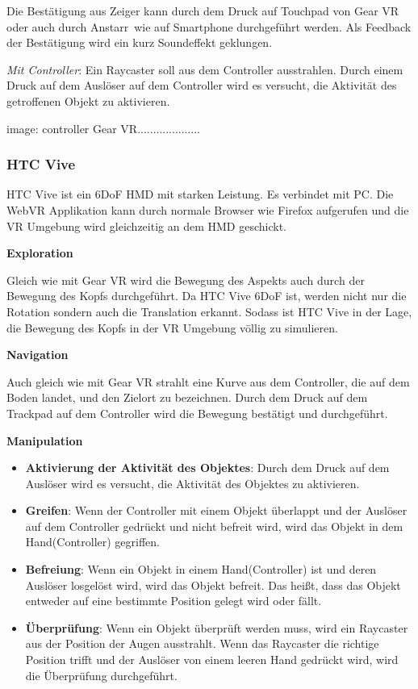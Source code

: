   Die Bestätigung aus Zeiger kann durch dem Druck auf Touchpad von Gear VR oder auch durch \glqq Anstarr\grqq\ wie auf Smartphone durchgeführt werden. Als Feedback der Bestätigung wird ein kurz Soundeffekt geklungen. 
  
  \textsl{Mit Controller}: Ein Raycaster soll aus dem Controller ausstrahlen. Durch einem Druck auf dem Auslöser auf dem Controller wird es versucht, die Aktivität des getroffenen Objekt zu aktivieren. 
  
  image: controller Gear VR....................
  
 \subsubsection{HTC Vive}
 HTC Vive ist ein 6DoF HMD mit starken Leistung. Es verbindet mit PC. Die WebVR Applikation kann durch normale Browser wie Firefox aufgerufen und die VR Umgebung wird gleichzeitig an dem HMD geschickt.
 
  \textbf{Exploration}
  
  Gleich wie mit Gear VR wird die Bewegung des Aspekts auch durch der Bewegung des Kopfs durchgeführt. Da HTC Vive 6DoF ist, werden nicht nur die Rotation sondern auch die Translation  erkannt. Sodass ist HTC Vive in der Lage, die Bewegung des Kopfs in der VR Umgebung völlig zu simulieren.
  
  \textbf{Navigation}
  
  Auch gleich wie mit Gear VR strahlt eine Kurve aus dem Controller, die auf dem Boden landet, und den Zielort zu bezeichnen. Durch dem Druck auf dem Trackpad auf dem Controller wird die Bewegung bestätigt und durchgeführt.
  
  \textbf{Manipulation}
  \begin{itemize}
  \item \textbf{Aktivierung der Aktivität des Objektes}: Durch dem Druck auf dem Auslöser wird es versucht, die Aktivität des Objektes zu aktivieren.
  \item \textbf{Greifen}: Wenn der Controller mit einem Objekt überlappt und der Auslöser auf dem Controller gedrückt und nicht befreit wird, wird das Objekt in dem Hand(Controller) gegriffen.
  \item \textbf{Befreiung}: Wenn ein Objekt in einem Hand(Controller) ist und deren Auslöser losgelöst wird, wird das Objekt befreit. Das heißt, dass das Objekt entweder auf eine bestimmte Position gelegt wird oder fällt.
  \item \textbf{Überprüfung}: Wenn ein Objekt überprüft werden muss, wird ein Raycaster aus der Position der Augen ausstrahlt. Wenn das Raycaster die richtige Position trifft und der Auslöser von einem leeren Hand gedrückt wird, wird die Überprüfung durchgeführt.
  \end{itemize}
  
